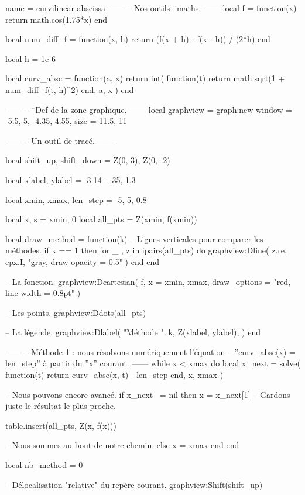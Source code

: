 \documentclass{standalone}
\begin{document}
\begin{luadraw}{name = curvilinear-abscissa}
------
-- Nos outils ¨maths.
------
local f = function(x)
  return math.cos(1.75*x)
end

local num_diff_f = function(x, h)
  return (f(x + h) - f(x - h)) / (2*h)
end

local h = 1e-6

local curv_absc = function(a, x)
  return int(
    function(t)
      return math.sqrt(1 + num_diff_f(t, h)^2)
    end,
    a, x
  )
end

------
-- ¨Def de la zone graphique.
------
local graphview = graph:new{
  window = {-5.5, 5, -4.35, 4.55},
  size   = {11.5, 11}
}

------
-- Un outil de tracé.
------

local shift_up, shift_down = Z(0, 3), Z(0, -2)

local xlabel, ylabel = -3.14 - .35, 1.3

local xmin, xmax, len_step = -5, 5, 0.8

local x, s    = xmin, 0
local all_pts = {Z(xmin, f(xmin))}

local draw_method = function(k)
-- Lignes verticales pour comparer les méthodes.
  if k == 1 then
    for _ , z in ipairs(all_pts) do
      graphview:Dline(
        {z.re, cpx.I},
        "gray, draw opacity = 0.5"
      )
    end
  end

-- La fonction.
  graphview:Dcartesian(
    f,
    {
      x = {xmin, xmax},
      draw_options = "red, line width = 0.8pt"
    }
  )

-- Les points.
  graphview:Ddots(all_pts)

-- La légende.
  graphview:Dlabel(
    "Méthode "..k, Z(xlabel, ylabel), {}
  )
end


------
-- Méthode 1 : nous résolvons numériquement l'équation
-- ''curv_absc(x) = len_step'' à partir du ''x'' courant.
------
while x < xmax do
  local x_next = solve(
    function(t)
      return curv_absc(x, t) - len_step
    end,
    x, xmax
  )

-- Nous pouvons encore avancé.
  if x_next ~= nil then
    x = x_next[1]  -- Gardons juste le résultat le plus proche.

    table.insert(all_pts, Z(x, f(x)))

-- Nous sommes au bout de notre chemin.
  else
    x = xmax
  end
end

local nb_method = 0

-- Délocalisation "relative" du repère courant.
graphview:Shift(shift_up)


\end{luadraw}
\end{document}
